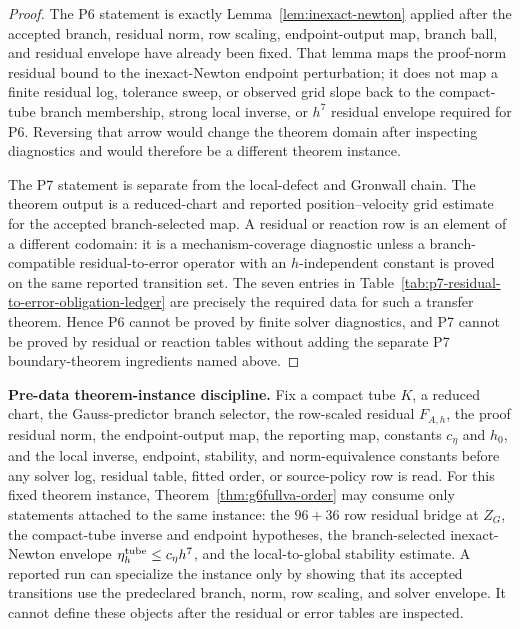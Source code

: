 \documentclass[preprint,12pt]{elsarticle}
\begin{document}
\begin{proof}
The P6 statement is exactly Lemma~\ref{lem:inexact-newton} applied after the
accepted branch, residual norm, row scaling, endpoint-output map, branch ball,
and residual envelope have already been fixed.  That lemma maps the
proof-norm residual bound to the inexact-Newton endpoint perturbation; it
does not map a finite residual log, tolerance sweep, or observed grid slope
back to the compact-tube branch membership, strong local inverse, or
\(h^7\) residual envelope required for P6.  Reversing that arrow would change
the theorem domain after inspecting diagnostics and would therefore be a
different theorem instance.

The P7 statement is separate from the local-defect and Gronwall chain.  The
theorem output is a reduced-chart and reported position--velocity grid
estimate for the accepted branch-selected map.  A residual or reaction row is
an element of a different codomain: it is a mechanism-coverage diagnostic
unless a branch-compatible residual-to-error operator with an
\(h\)-independent constant is proved on the same reported transition set.
The seven entries in Table~\ref{tab:p7-residual-to-error-obligation-ledger}
are precisely the required data for such a transfer theorem.  Hence P6 cannot
be proved by finite solver diagnostics, and P7 cannot be proved by residual
or reaction tables without adding the separate P7 boundary-theorem ingredients
named above.
\end{proof}

\noindent\textbf{Pre-data theorem-instance discipline.}
Fix a compact tube \(K\), a reduced chart, the Gauss-predictor branch
selector, the row-scaled residual \(F_{A,h}\), the proof residual norm, the
endpoint-output map, the reporting map, constants \(c_\eta\) and \(h_0\), and
the local inverse, endpoint, stability, and norm-equivalence constants before
any solver log, residual table, fitted order, or source-policy row is read.
For this fixed theorem instance, Theorem~\ref{thm:g6fullva-order} may consume
only statements attached to the same instance:
the \(96+36\) row residual bridge at \(Z_G\), the compact-tube inverse and
endpoint hypotheses, the branch-selected inexact-Newton envelope
\(\eta_h^{\rm tube}\le c_\eta h^7\), and the local-to-global stability
estimate.  A reported run can specialize the instance only by showing that
its accepted transitions use the predeclared branch, norm, row scaling, and
solver envelope.  It cannot define these objects after the residual or error
tables are inspected.
\end{document}
